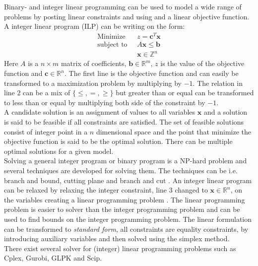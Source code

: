 Binary- and integer linear programming can be used to model a wide range of problems by posting linear constraints and 
using and a linear objective function. A integer linear program (ILP) can be writing on the form: 
\begin{align}
 \text{Minimize }\; &z =  \mathbf{c}^T\mathbf{x} \\ 
 \text{subject to } \; & A\mathbf{x} \leq \mathbf{b} \\ 
 & \mathbf{x} \in \mathbb{Z}^n
\end{align}
Here $A$ is a $n \times m$ matrix of coefficients, $\mathbf{b} \in \mathbb{R}^m$, $z$ is the value of the objective 
function and $\mathbf{c} \in \mathbb{R}^n$. The first line is the objective function and can easily be transformed to a 
maximization problem by multiplying by $-1$. The relation in line 2 can be a mix of $\{\leq,=,\geq\}$ but greater 
than or equal can be transformed to less than or equal by multiplying both side of the constraint by $-1$.  \\ 
A candidate solution is an assignment of values to all variables $\mathbf{x}$ and a solution is said to be feasible if 
all constraints are satisfied. The set of feasible solutions consist of integer point in a $n$ dimensional space and 
the point that minimize the objective function is said to be the optimal solution. There can be multiple optimal 
solutions for a given model. \\
Solving a general integer program or binary program is a NP-hard problem \cite[p.30]{ilpbog} and several techniques are 
developed for solving them. The techniques can be i.e. branch and bound, cutting plane and branch and cut 
\cite[p.31]{ilpbog}. An integer linear program can be relaxed by relaxing the integer constraint, line 3 changed to 
$\mathbf{x} \in \mathbb{R}^n$, on the variables creating a linear programming problem \cite[p. 30]{ilpbog}. The linear 
programming problem is easier to solver than the integer programming problem and can be used to find bounds on the 
integer programming problem. The linear formulation can be transformed to \emph{standard form}, all constraints are 
equality constraints, by introducing auxiliary variables and then solved using the simplex method. \\ 
There exist several solver for (integer) linear programming problems such as Cplex, Gurobi, GLPK and Scip. 
